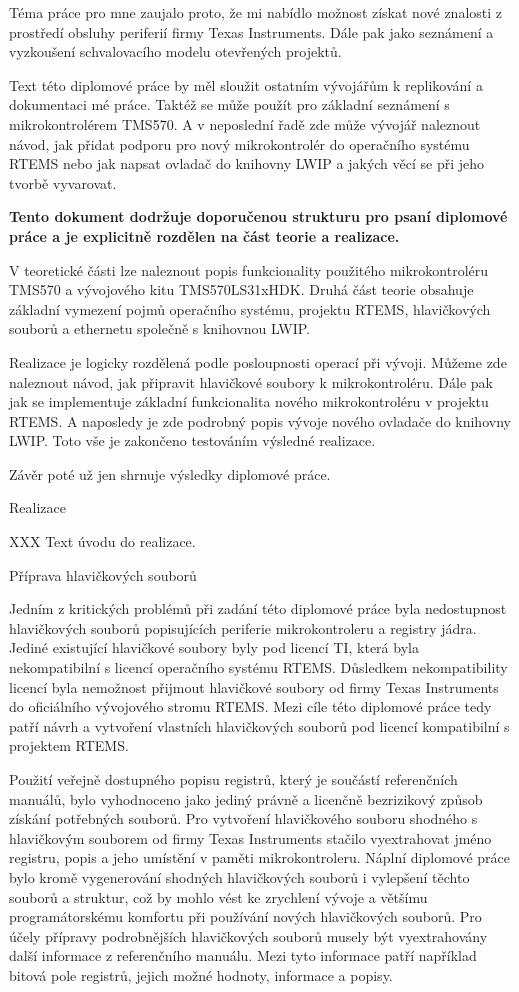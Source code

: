 Téma práce pro mne zaujalo proto, že mi nabídlo možnost získat nové znalosti z prostředí obsluhy periferií firmy Texas Instruments.
Dále pak jako seznámení a vyzkoušení schvalovacího modelu otevřených projektů.

Text této diplomové práce by měl sloužit ostatním vývojářům k replikování a dokumentaci mé práce.
Taktéž se může použít pro základní seznámení s mikrokontrolérem TMS570.
A v neposlední řadě zde může vývojář naleznout návod, jak přidat podporu pro nový mikrokontrolér do operačního systému RTEMS nebo jak napsat ovladač do knihovny LWIP a jakých věcí se při jeho tvorbě vyvarovat.   

\medskip

{\bf
Tento dokument dodržuje doporučenou strukturu pro psaní diplomové práce a je explicitně rozdělen na část teorie a realizace.

V teoretické části lze naleznout popis funkcionality použitého mikrokontroléru TMS570 a vývojového kitu TMS570LS31xHDK.
Druhá část teorie obsahuje základní vymezení pojmů operačního systému, projektu RTEMS, hlavičkových souborů a ethernetu společně s knihovnou LWIP.

Realizace je logicky rozdělená podle posloupnosti operací při vývoji.
Můžeme zde naleznout návod, jak připravit hlavičkové soubory k mikrokontroléru.
Dále pak jak se implementuje základní funkcionalita nového mikrokontroléru v projektu RTEMS.
A naposledy je zde podrobný popis vývoje nového ovladače do knihovny LWIP.
Toto vše je zakončeno testováním výsledné realizace.

Závěr poté už jen shrnuje výsledky diplomové práce.}


\chap Realizace

XXX Text úvodu do realizace.

\sec Příprava hlavičkových souborů

	Jedním z kritických problémů při zadání této diplomové práce byla nedostupnost hlavičkových souborů popisujících periferie mikrokontroleru a registry jádra.
Jediné existující hlavičkové soubory byly pod licencí TI, která byla nekompatibilní s licencí operačního systému RTEMS.
Důsledkem nekompatibility licencí byla nemožnost přijmout hlavičkové soubory od firmy Texas Instruments do oficiálního vývojového stromu RTEMS.
Mezi cíle této diplomové práce tedy patří návrh a vytvoření vlastních hlavičkových souborů pod licencí kompatibilní s projektem RTEMS.

Použití veřejně dostupného popisu registrů, který je součástí referenčních manuálů, bylo vyhodnoceno jako jediný právně a licenčně bezrizikový způsob získání potřebných souborů.
Pro vytvoření hlavičkového souboru shodného s hlavičkovým souborem od firmy Texas Instruments stačilo vyextrahovat jméno registru, popis a jeho umístění v paměti mikrokontroleru.
Náplní diplomové práce bylo kromě vygenerování shodných hlavičkových souborů i vylepšení těchto souborů a struktur, což by mohlo vést ke zrychlení vývoje a většímu programátorskému komfortu při používání nových hlavičkových souborů.
Pro účely přípravy podrobnějších hlavičkových souborů musely být vyextrahovány další informace z referenčního manuálu.
Mezi tyto informace patří například bitová pole registrů, jejich možné hodnoty, informace a popisy.

